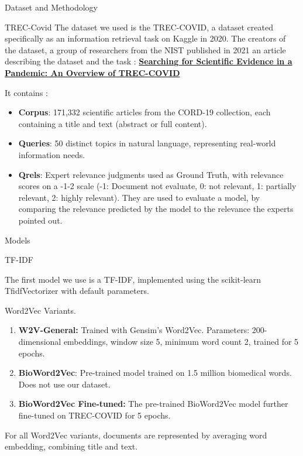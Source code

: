 \documentclass[10pt, french]{beamer}
\begin{document}
\begin{frame}{Dataset and Methodology}
\begin{block}{TREC-Covid}
    The dataset we used is the TREC-COVID, a dataset created specifically as an information retrieval task 
on Kaggle in 2020. The creators of the dataset, a group of researchers from the NIST published in 2021 an article describing the dataset and the task : \href{https://arxiv.org/abs/2104.09632}{\textbf{Searching for Scientific Evidence in a Pandemic: An Overview of TREC-COVID}}
\end{block}
It contains : 
\begin{itemize}
    \item \textbf{Corpus}: 171,332 scientific articles from the CORD-19 collection, each containing a title and text (abstract or full
content).
\item \textbf{Queries}: 50 distinct topics in natural language, representing real-world information needs.

\item \textbf{Qrels}: Expert relevance judgments used as Ground Truth,
with relevance scores on a -1-2 scale (-1: Document not
evaluate, 0: not relevant, 1: partially relevant, 2: highly
relevant). They are used to evaluate a model, by comparing the relevance predicted by the model to the relevance the experts pointed out.

\end{itemize}
\end{frame}

\begin{frame}{Models}

\begin{block}{TF-IDF}
    
     The first model we use is a TF-IDF, implemented using the scikit-learn TfidfVectorizer with default parameters. \\
   
\end{block}
\begin{block}{Word2Vec Variants.}
\begin{enumerate}
    \item \textbf{W2V-General:} Trained with Gensim’s Word2Vec. Parameters: 200-dimensional embeddings, window size 5, minimum word count 2, trained for 5 epochs.
    \item \textbf{BioWord2Vec}: Pre-trained model trained on 1.5 million biomedical words. Does not use our dataset.
    \item \textbf{BioWord2Vec Fine-tuned:} The pre-trained BioWord2Vec
model further fine-tuned on TREC-COVID for 5 epochs.
    
\end{enumerate}
 For all Word2Vec variants, documents are represented by averaging word embedding, combining title and text.
    
\end{block}
    
\end{frame}
\end{document}
